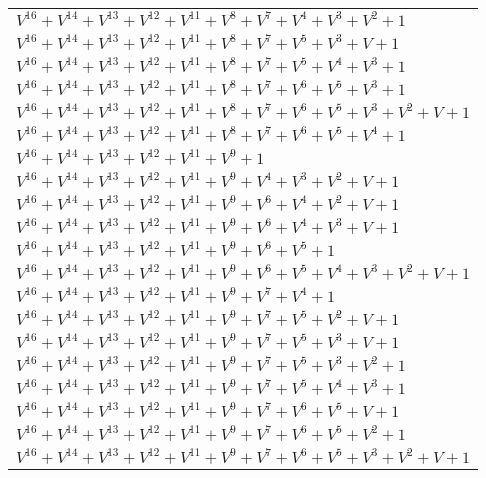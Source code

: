 \documentclass[12pt]{article}
\begin{document}
\begin{adjustwidth}{-4cm}{}
\begin{center}
\begin{longtable}{|l|}
$V^{16}  +V^{14}  +V^{13}  +V^{12}  +V^{11}  +V^{8}  +V^{7}  +V^{4}  +V^{3}  +V^{2}  + 1$ \\
$V^{16}  +V^{14}  +V^{13}  +V^{12}  +V^{11}  +V^{8}  +V^{7}  +V^{5}  +V^{3}  + V + 1$ \\
$V^{16}  +V^{14}  +V^{13}  +V^{12}  +V^{11}  +V^{8}  +V^{7}  +V^{5}  +V^{4}  +V^{3}  + 1$ \\
$V^{16}  +V^{14}  +V^{13}  +V^{12}  +V^{11}  +V^{8}  +V^{7}  +V^{6}  +V^{5}  +V^{3}  + 1$ \\
$V^{16}  +V^{14}  +V^{13}  +V^{12}  +V^{11}  +V^{8}  +V^{7}  +V^{6}  +V^{5}  +V^{3}  +V^{2}  + V + 1$ \\
$V^{16}  +V^{14}  +V^{13}  +V^{12}  +V^{11}  +V^{8}  +V^{7}  +V^{6}  +V^{5}  +V^{4}  + 1$ \\
$V^{16}  +V^{14}  +V^{13}  +V^{12}  +V^{11}  +V^{9}  + 1$ \\
$V^{16}  +V^{14}  +V^{13}  +V^{12}  +V^{11}  +V^{9}  +V^{4}  +V^{3}  +V^{2}  + V + 1$ \\
$V^{16}  +V^{14}  +V^{13}  +V^{12}  +V^{11}  +V^{9}  +V^{6}  +V^{4}  +V^{2}  + V + 1$ \\
$V^{16}  +V^{14}  +V^{13}  +V^{12}  +V^{11}  +V^{9}  +V^{6}  +V^{4}  +V^{3}  + V + 1$ \\
$V^{16}  +V^{14}  +V^{13}  +V^{12}  +V^{11}  +V^{9}  +V^{6}  +V^{5}  + 1$ \\
$V^{16}  +V^{14}  +V^{13}  +V^{12}  +V^{11}  +V^{9}  +V^{6}  +V^{5}  +V^{4}  +V^{3}  +V^{2}  + V + 1$ \\
$V^{16}  +V^{14}  +V^{13}  +V^{12}  +V^{11}  +V^{9}  +V^{7}  +V^{4}  + 1$ \\
$V^{16}  +V^{14}  +V^{13}  +V^{12}  +V^{11}  +V^{9}  +V^{7}  +V^{5}  +V^{2}  + V + 1$ \\
$V^{16}  +V^{14}  +V^{13}  +V^{12}  +V^{11}  +V^{9}  +V^{7}  +V^{5}  +V^{3}  + V + 1$ \\
$V^{16}  +V^{14}  +V^{13}  +V^{12}  +V^{11}  +V^{9}  +V^{7}  +V^{5}  +V^{3}  +V^{2}  + 1$ \\
$V^{16}  +V^{14}  +V^{13}  +V^{12}  +V^{11}  +V^{9}  +V^{7}  +V^{5}  +V^{4}  +V^{3}  + 1$ \\
$V^{16}  +V^{14}  +V^{13}  +V^{12}  +V^{11}  +V^{9}  +V^{7}  +V^{6}  +V^{5}  + V + 1$ \\
$V^{16}  +V^{14}  +V^{13}  +V^{12}  +V^{11}  +V^{9}  +V^{7}  +V^{6}  +V^{5}  +V^{2}  + 1$ \\
$V^{16}  +V^{14}  +V^{13}  +V^{12}  +V^{11}  +V^{9}  +V^{7}  +V^{6}  +V^{5}  +V^{3}  +V^{2}  + V + 1$ \\

\end{longtable}
\end{center}
\end{adjustwidth}
\end{document}
